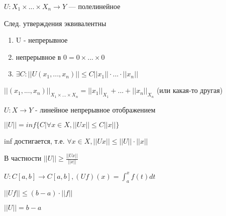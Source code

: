  \begin{theorem}
     $U : X_1 \times ... \times X_n \to Y$ --- полелинейное

     След. утверждения эквивалентны

     \begin{enumerate}
         \item U - непрерывное
         \item непрерывное в $0 = 0 \times ... \times 0$
         \item $\exists C : ||U(x_1, ... , x_n) || \leqslant C ||x_1|| \cdot ... \cdot ||x_n|| $
     \end{enumerate}

     $||(x_1, ... , x_n)||_{X_1 \times ... \times X_n} = ||x_1||_{X_1} + ... + ||x_n||_{X_n}$ (или какая-то другая)
 \end{theorem}

 \begin{definition}
     $U : X \to Y$ - линейное непрерывное отображением

     $||U|| = inf {\{ C | \forall x \in X,  ||Ux|| \leqslant C ||x||\} }$
 \end{definition}

 \begin{remark}
     inf достигается, т.е. $\forall x \in X, ||Ux||\leqslant ||U|| \cdot ||x||$
    
     В частности $||U|| \geqslant \frac{||Ux||}{||x||} $
 \end{remark}

 \begin{example}
     $U : C[a, b] \to C[a, b], (Uf)(x) = \int_a^xf(t)dt$

     $||Uf|| \leqslant (b - a) \cdot ||f||$

     $||U|| = b - a$
 \end{example}